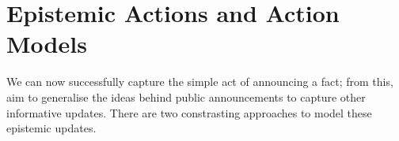 \documentclass[10pt, a4paper, twoside]{article}
\begin{document}
\section{Epistemic Actions and Action Models} \label{estAct}
We can now successfully capture the simple act of announcing a fact; from this,
aim to generalise the ideas behind public announcements to capture other
informative updates.
There are two constrasting approaches to model these epistemic updates.
%
\end{document}
